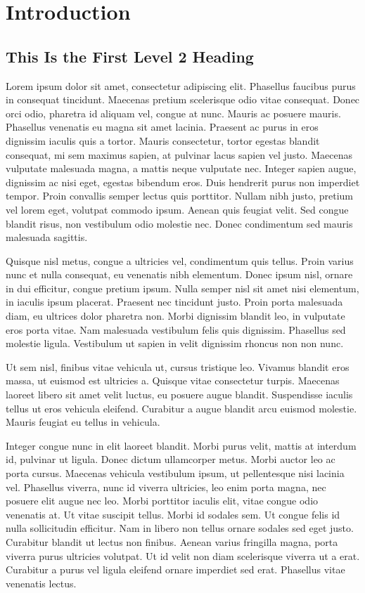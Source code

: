 \section{Introduction}

\subsection{This Is the First Level 2 Heading}

Lorem ipsum dolor sit amet, consectetur adipiscing elit. Phasellus faucibus purus in consequat tincidunt. Maecenas pretium scelerisque odio vitae consequat. Donec orci odio, pharetra id aliquam vel, congue at nunc. Mauris ac posuere mauris. Phasellus venenatis eu magna sit amet lacinia. Praesent ac purus in eros dignissim iaculis quis a tortor. Mauris consectetur, tortor egestas blandit consequat, mi sem maximus sapien, at pulvinar lacus sapien vel justo. Maecenas vulputate malesuada magna, a mattis neque vulputate nec. Integer sapien augue, dignissim ac nisi eget, egestas bibendum eros. Duis hendrerit purus non imperdiet tempor. Proin convallis semper lectus quis porttitor. Nullam nibh justo, pretium vel lorem eget, volutpat commodo ipsum. Aenean quis feugiat velit. Sed congue blandit risus, non vestibulum odio molestie nec. Donec condimentum sed mauris malesuada sagittis.

Quisque nisl metus, congue a ultricies vel, condimentum quis tellus. Proin varius nunc et nulla consequat, eu venenatis nibh elementum. Donec ipsum nisl, ornare in dui efficitur, congue pretium ipsum. Nulla semper nisl sit amet nisi elementum, in iaculis ipsum placerat. Praesent nec tincidunt justo. Proin porta malesuada diam, eu ultrices dolor pharetra non. Morbi dignissim blandit leo, in vulputate eros porta vitae. Nam malesuada vestibulum felis quis dignissim. Phasellus sed molestie ligula. Vestibulum ut sapien in velit dignissim rhoncus non non nunc.

Ut sem nisl, finibus vitae vehicula ut, cursus tristique leo. Vivamus blandit eros massa, ut euismod est ultricies a. Quisque vitae consectetur turpis. Maecenas laoreet libero sit amet velit luctus, eu posuere augue blandit. Suspendisse iaculis tellus ut eros vehicula eleifend. Curabitur a augue blandit arcu euismod molestie. Mauris feugiat eu tellus in vehicula.

Integer congue nunc in elit laoreet blandit. Morbi purus velit, mattis at interdum id, pulvinar ut ligula. Donec dictum ullamcorper metus. Morbi auctor leo ac porta cursus. Maecenas vehicula vestibulum ipsum, ut pellentesque nisi lacinia vel. Phasellus viverra, nunc id viverra ultricies, leo enim porta magna, nec posuere elit augue nec leo. Morbi porttitor iaculis elit, vitae congue odio venenatis at. Ut vitae suscipit tellus. Morbi id sodales sem. Ut congue felis id nulla sollicitudin efficitur. Nam in libero non tellus ornare sodales sed eget justo. Curabitur blandit ut lectus non finibus. Aenean varius fringilla magna, porta viverra purus ultricies volutpat. Ut id velit non diam scelerisque viverra ut a erat. Curabitur a purus vel ligula eleifend ornare imperdiet sed erat. Phasellus vitae venenatis lectus.

